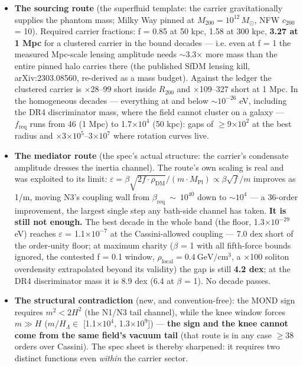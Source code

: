 \documentclass[11pt,a4paper]{article}
\begin{document}
\begin{itemize}
\item \textbf{The sourcing route} (the superfluid template: the carrier gravitationally supplies the phantom mass; Milky Way pinned at $M_{200} = 10^{12}\,M_\odot$, NFW $c_{200}$ = 10). Required carrier fractions: f = 0.85 at 50 kpc, 1.58 at 300 kpc, \textbf{3.27 at 1 Mpc} for a clustered carrier in the bound decades --- i.e. even at f = 1 the measured Mpc-scale lensing amplitude needs $\sim$3.3$\times$ more mass than the entire pinned halo carries there (the published SfDM lensing kill, arXiv:2303.08560, re-derived as a mass budget). Against the ledger the clustered carrier is $\times$28--99 short inside $R_{200}$ and $\times$109--327 short at 1 Mpc. In the homogeneous decades --- everything at and below $\sim{}10^{-26}$ eV, including the DR4 discriminator mass, where the field cannot cluster on a galaxy --- $f_{\mathrm{req}}$ runs from 46 (1 Mpc) to 1.7$\times10^{4}$ (50 kpc): gaps of $\ge$9$\times10^{2}$ at the best radius and $\times$3$\times10^{5}$--3$\times10^{7}$ where rotation curves live.

\item \textbf{The mediator route} (the spec's actual structure: the carrier's condensate amplitude dresses the inertia channel). The route's own scaling is real and was exploited to its limit: $\varepsilon = \beta\sqrt{2f\cdot\rho_{\mathrm{DM}}}/(m\cdot M_{\mathrm{Pl}}) \propto \beta\sqrt{f}/m$ improves as 1/m, moving N3's coupling wall from $\beta_{\mathrm{req}}\ \sim\ 10^{40}$ down to $\sim{}10^{4}$ --- a 36-order improvement, the largest single step any bath-side channel has taken. \textbf{It is still not enough.} The best decade in the whole band (the floor, 1.3$\times10^{-29}$ eV) reaches $\varepsilon$ = 1.1$\times10^{-7}$ at the Cassini-allowed coupling --- 7.0 dex short of the order-unity floor; at maximum charity ($\beta$ = 1 with all fifth-force bounds ignored, the contested f = 0.1 window, $\rho_{\mathrm{local}} = 0.4\ \mathrm{GeV/cm^3}$, a $\times$100 soliton overdensity extrapolated beyond its validity) the gap is still \textbf{4.2 dex}; at the DR4 discriminator mass it is 8.9 dex (6.4 at $\beta$ = 1). No decade passes.

\item \textbf{The structural contradiction} (new, and convention-free): the MOND sign requires $m^2 < 2H^2$ (the N1/N3 tail channel), while the knee window forces $m \gg H$ ($m/H_\Lambda \in$ [1.1$\times10^{4}$, 1.3$\times10^{9}$]) --- \textbf{the sign and the knee cannot come from the same field's vacuum tail} (that route is in any case $\ge$38 orders over Cassini). The spec sheet is thereby sharpened: it requires two distinct functions even \emph{within} the carrier sector.


\end{itemize}
\end{document}
